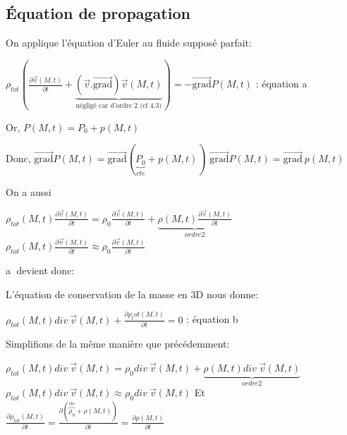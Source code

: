 \documentclass[a4paper, 12pt]{article}
\begin{document}
\subsection{Équation de propagation}
On applique l'équation d'Euler au fluide supposé parfait:
\begin{center}
$\rho_{tot}(\frac{\partial \vec{v}(M,t)}{\partial t}+\underbrace{(\vec{v}.\overrightarrow{\textrm{grad}})\vec{v}(M,t)}_{\text{négligé car d'ordre 2 (cf 4.3)}})=-\overrightarrow{\textrm{grad}}P(M,t)$    : équation \textcircled{a}
\end{center}
Or, $P(M,t)=P_0+p(M,t)$\newline
\begin{center}
Donc, $\overrightarrow{\textrm{grad}}P(M,t)=\overrightarrow{\textrm{grad}}(\underbrace{P_0}_{cte}+p(M,t))$ \newline
	  $\overrightarrow{\textrm{grad}}P(M,t)=\overrightarrow{\textrm{grad}}\:p(M,t)$	
\end{center}
On a aussi
\begin{center}
$\rho_{tot}(M,t)\frac{\partial \vec{v}(M,t)}{\partial t}=\rho_0\frac{\partial \vec{v}(M,t)}{\partial t}+\underbrace{\rho(M,t)\frac{\partial \vec{v}(M,t)}{\partial t}}_{ordre 2}$\newline \newline
$\rho_{tot}(M,t)\frac{\partial \vec{v}(M,t)}{\partial t}\approx\rho_0\frac{\partial \vec{v}(M,t)}{\partial t}$
\end{center}
\textcircled{a} devient donc:
\begin{center}
\end{center}
L'équation de conservation de la masse en 3D nous donne:
\begin{center}
$\rho_{tot}(M,t)div\:\vec{v}(M,t)+\frac{\partial \rho_tot(M,t)}{\partial t}=0$    : équation \textcircled{b}
\end{center}
Simplifions de la même manière que précédemment:
\begin{center}
$\rho_{tot}(M,t)div\:\vec{v}(M,t)=\rho_0div\:\vec{v}(M,t)+\underbrace{\rho(M,t)div\:\vec{v}(M,t)}_{ordre 2}$\newline
$\rho_{tot}(M,t)div\:\vec{v}(M,t)\approx\rho_0div\:\vec{v}(M,t)$\newline \newline
Et $\frac{\partial \rho_{tot}(M,t)}{\partial t}=\frac{\partial (\overbrace{\rho_0}^{cte}+\rho(M,t))}{\partial t}=\frac{\partial \rho(M,t)}{\partial t}$
\end{center}
\end{document}
